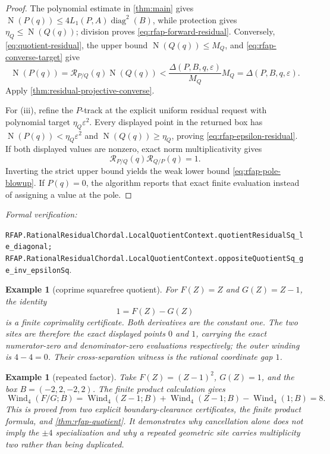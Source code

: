 \documentclass[11pt]{article}
\newtheorem{example}[theorem]{Example}
\newcommand{\Norm}[1]{\operatorname{N}\!\left(#1\right)}
\newcommand{\Wind}{\operatorname{Wind}}
\newcommand{\diamq}{\operatorname{diag}^{2}}
\newcommand{\eps}{\varepsilon}
\newcommand{\leanref}[1]{\par\smallskip\noindent
  \emph{Formal verification:}\par\nobreak
  {\raggedright\nolinkurl{#1}.\par}}
\begin{document}
\begin{proof}
The polynomial estimate in \cref{thm:main} gives
$\Norm{P(q)}\le4L_1(P,A)\diamq(B)$, while protection gives
$\eta_Q\le\Norm{Q(q)}$; division proves
\eqref{eq:rfap-forward-residual}.  Conversely,
\eqref{eq:quotient-residual}, the upper bound $\Norm{Q(q)}\le M_Q$, and
\eqref{eq:rfap-converse-target} give
\[
 \Norm{P(q)}
 =\mathcal R_{P/Q}(q)\Norm{Q(q)}
 <\frac{\Delta(P,B,q,\eps)}{M_Q}M_Q
 =\Delta(P,B,q,\eps).
\]
Apply \cref{thm:residual-projective-converse}.

For (iii), refine the $P$-track at the explicit uniform residual request with
polynomial target $\eta_Q\eps^2$.  Every displayed point in the returned box
has $\Norm{P(q)}<\eta_Q\eps^2$ and
$\Norm{Q(q)}\ge\eta_Q$, proving
\eqref{eq:rfap-epsilon-residual}.  If both displayed values are nonzero,
exact norm multiplicativity gives
\[
 \mathcal R_{P/Q}(q)\mathcal R_{Q/P}(q)=1.
\]
Inverting the strict upper bound yields the weak lower bound
\eqref{eq:rfap-pole-blowup}.  If $P(q)=0$, the algorithm reports that exact
finite evaluation instead of assigning a value at the pole.
\end{proof}

\leanref{RFAP.RationalResidualChordal.LocalQuotientContext.quotientResidualSq_le_diagonal;
RFAP.RationalResidualChordal.LocalQuotientContext.oppositeQuotientSq_ge_inv_epsilonSq}

\begin{example}[coprime squarefree quotient]
For $F(Z)=Z$ and $G(Z)=Z-1$, the identity
\[
             1=F(Z)-G(Z)
\]
is a finite coprimality certificate.  Both derivatives are the constant one.
The two sites are therefore the exact displayed points $0$ and $1$, carrying
the exact numerator-zero and denominator-zero evaluations respectively; the
outer winding is $4-4=0$.  Their cross-separation witness is the rational
coordinate gap $1$.
\end{example}

\begin{example}[repeated factor]
Take $F(Z)=(Z-1)^2$, $G(Z)=1$, and the box
$B=(-2,2,-2,2)$.  The finite product calculation gives
\[
       \Wind_4(F/G;B)
       =\Wind_4(Z-1;B)+\Wind_4(Z-1;B)-\Wind_4(1;B)=8.
\]
This is proved from two explicit boundary-clearance certificates, the finite
product formula, and \cref{thm:rfap-quotient}.  It demonstrates why
cancellation alone does not imply the $\pm4$ specialization and why a
repeated geometric site carries multiplicity two rather than being duplicated.
\end{example}
\end{document}
